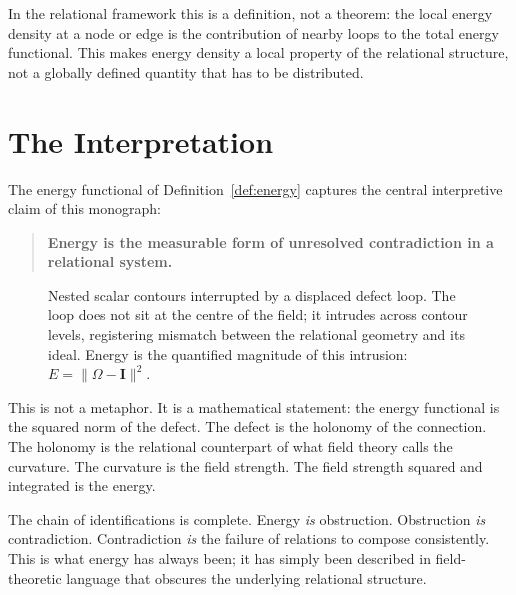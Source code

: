 \documentclass[12pt,a4paper,openany]{book}
\theoremstyle{plain}
\theoremstyle{definition}
\theoremstyle{remark}
\begin{document}
In the relational framework this is a definition, not a theorem: the local energy density at a node or edge is the contribution of nearby loops to the total energy functional. This makes energy density a local property of the relational structure, not a globally defined quantity that has to be distributed.

\section{The Interpretation}

The energy functional of Definition~\ref{def:energy} captures the central interpretive claim of this monograph:

\begin{quote}
\textbf{Energy is the measurable form of unresolved contradiction in a relational system.}
\end{quote}

\begin{figure}[h]
\centering
{}
\caption[Energy-obstruction glyph, Chapter~5]{Nested scalar contours interrupted by a displaced defect loop. The loop does not sit at the centre of the field; it intrudes across contour levels, registering mismatch between the relational geometry and its ideal. Energy is the quantified magnitude of this intrusion: $E = \|\Omega - \mathbf{I}\|^2$.}
\label{fig:glyph_energy}
\end{figure}

This is not a metaphor. It is a mathematical statement: the energy functional is the squared norm of the defect. The defect is the holonomy of the connection. The holonomy is the relational counterpart of what field theory calls the curvature. The curvature is the field strength. The field strength squared and integrated is the energy.

The chain of identifications is complete. Energy \emph{is} obstruction. Obstruction \emph{is} contradiction. Contradiction \emph{is} the failure of relations to compose consistently. This is what energy has always been; it has simply been described in field-theoretic language that obscures the underlying relational structure.
\end{document}
